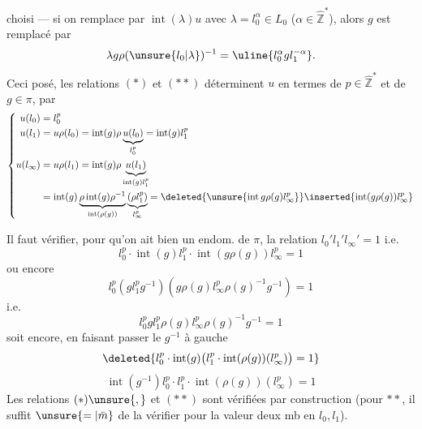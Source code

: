 choisi --- si on  remplace  par $\operatorname{int}(\lambda)u$ avec $\lambda=l_0^\alpha\in L_0$ ($\alpha\in\hat{\mathbb Z}^{*}$), alors $g$ est remplacé par
\[
\lambda g\rho(\unsure{l_0|\lambda})^{-1}=\uline{l_0^\alpha gl_1^{-\alpha}}.
\]
Ceci posé,  les relations $(*)$ et $(**)$ déterminent $u$ en termes de $p\in\hat{\mathbb Z}^{*}$ et de $g\in\pi$, par
\[
\left\{\begin{aligned}
u(l_0)&=l_0^p\\
u(l_1)&=u\rho(l_0)=\operatorname{int}(g)\rho\underbrace{u(l_0)}_{l_0^p}=\operatorname{int}(g)l_1^p\\
u(l_\infty)&=u\rho(l_1)=\operatorname{int}(g)\rho\underbrace{u(l_1)}_{\operatorname{int}(g)l_1^p}\\
&=\operatorname{int}(g)\underbrace{\rho\operatorname{int}(g)\rho^{-1}}_{\operatorname{int}(\rho(g))}\underbrace{(\rho l_1^p)}_{l_\infty^p}
=\deleted{\unsure{\operatorname{int}g\rho(g)l_\infty^p}}\inserted{\operatorname{int}(g\rho(g))l_\infty^p}
\end{aligned}\right.
\]

Il faut vérifier, pour qu'on ait bien un endom. de $\pi$, la relation $l_0'l_1'l_\infty'=1$ i.e.
\[
\boxed{l_0^p\cdot\operatorname{int}(g)l_1^p\cdot\operatorname{int}(g\rho(g))l_\infty^p=1}
\]
ou encore
\[
l_0^p(gl_1^pg^{-1})(g\rho(g)l_\infty^p\rho(g)^{-1}g^{-1})=1
\]
i.e.
\[
l_0^pgl_1^p\rho(g)l_\infty^p\rho(g)^{-1}g^{-1}=1
\]
soit encore, en faisant passer le $g^{-1}$ à gauche
\[
\deleted{l_0^p\cdot\operatorname{int}(g)\bigl(l_1^p\cdot\operatorname{int}(\rho(g))(l_\infty^p)\bigr)=1}
\]
\[
\operatorname{int}(g^{-1})l_0^p\cdot l_1^p\cdot\operatorname{int}(\rho(g))(l_\infty^p)=1
\]
Les relations $(*)\unsure{,}$ et $(**)$ sont vérifiées par construction (pour $**$, il suffit $\unsure{=|\bar m}$ de la vérifier pour la valeur  deux mb en $l_0,l_1$).
